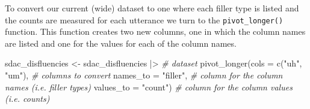 \documentclass[
  letterpaper,
]{latex/krantz}
\newenvironment{Shaded}{\begin{snugshade}}{\end{snugshade}}
\newcommand{\AttributeTok}[1]{\textcolor[rgb]{0.00,0.00,0.00}{#1}}
\newcommand{\CommentTok}[1]{\textcolor[rgb]{0.00,0.00,0.00}{\textit{#1}}}
\newcommand{\FunctionTok}[1]{\textcolor[rgb]{0.00,0.00,0.00}{#1}}
\newcommand{\NormalTok}[1]{\textcolor[rgb]{0.00,0.00,0.00}{#1}}
\newcommand{\OtherTok}[1]{\textcolor[rgb]{0.00,0.00,0.00}{#1}}
\newcommand{\SpecialCharTok}[1]{\textcolor[rgb]{0.00,0.00,0.00}{#1}}
\newcommand{\StringTok}[1]{\textcolor[rgb]{0.00,0.00,0.00}{#1}}
\begin{document}
To convert our current (wide) dataset to one where each filler type is
listed and the counts are measured for each utterance we turn to the
\texttt{pivot\_longer()} function. This function creates two new
columns, one in which the column names are listed and one for the values
for each of the column names.

\begin{Shaded}
\begin{Highlighting}[]
\NormalTok{sdac\_disfluencies }\OtherTok{\textless{}{-}} 
\NormalTok{  sdac\_disfluencies }\SpecialCharTok{|\textgreater{}} \CommentTok{\# dataset}
  \FunctionTok{pivot\_longer}\NormalTok{(}\AttributeTok{cols =} \FunctionTok{c}\NormalTok{(}\StringTok{"uh"}\NormalTok{, }\StringTok{"um"}\NormalTok{), }\CommentTok{\# columns to convert}
               \AttributeTok{names\_to =} \StringTok{"filler"}\NormalTok{, }\CommentTok{\# column for the column names (i.e. filler types)}
               \AttributeTok{values\_to =} \StringTok{"count"}\NormalTok{) }\CommentTok{\# column for the column values (i.e. counts)}
\end{Highlighting}
\end{Shaded}
\end{document}
